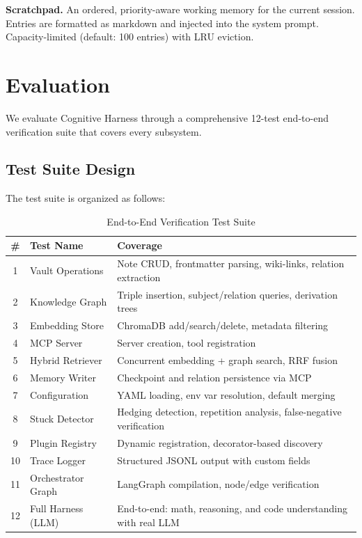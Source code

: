 \documentclass[conference]{IEEEtran}
\begin{document}
\textbf{Scratchpad.} An ordered, priority-aware working memory for the current session. Entries are formatted as markdown and injected into the system prompt. Capacity-limited (default: 100 entries) with LRU eviction.

\section{Evaluation}
\label{sec:eval}

We evaluate Cognitive Harness through a comprehensive 12-test end-to-end verification suite that covers every subsystem.

\subsection{Test Suite Design}

The test suite is organized as follows:

\begin{table}[htbp]
\caption{End-to-End Verification Test Suite}
\label{tab:tests}
\centering
\footnotesize
\begin{tabular}{@{}clp{3.8cm}@{}}
\toprule
\textbf{\#} & \textbf{Test Name} & \textbf{Coverage} \\
\midrule
1 & Vault Operations & Note CRUD, frontmatter parsing, wiki-links, relation extraction \\
2 & Knowledge Graph & Triple insertion, subject/relation queries, derivation trees \\
3 & Embedding Store & ChromaDB add/search/delete, metadata filtering \\
4 & MCP Server & Server creation, tool registration \\
5 & Hybrid Retriever & Concurrent embedding + graph search, RRF fusion \\
6 & Memory Writer & Checkpoint and relation persistence via MCP \\
7 & Configuration & YAML loading, env var resolution, default merging \\
8 & Stuck Detector & Hedging detection, repetition analysis, false-negative verification \\
9 & Plugin Registry & Dynamic registration, decorator-based discovery \\
10 & Trace Logger & Structured JSONL output with custom fields \\
11 & Orchestrator Graph & LangGraph compilation, node/edge verification \\
12 & Full Harness (LLM) & End-to-end: math, reasoning, and code understanding with real LLM \\
\bottomrule
\end{tabular}
\end{table}
\end{document}

